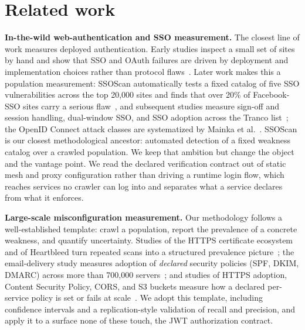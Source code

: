 \section{Related work}\label{sec:related}
\noindent\textbf{In-the-wild web-authentication and SSO measurement.} The closest
line of work measures deployed authentication. Early studies inspect a small set of
sites by hand and show that SSO and OAuth failures are driven by deployment and
implementation choices rather than protocol flaws~\cite{authzmeas2012wangsignmein,authzmeas2012sunoauth}.
Later work makes this a population measurement: SSOScan automatically tests a fixed
catalog of five SSO vulnerabilities across the top 20{,}000 sites and finds that over
20\% of Facebook-SSO sites carry a serious flaw~\cite{authzmeas2014ssoscan}, and
subsequent studies measure sign-off and session handling, dual-window SSO, and SSO
adoption across the Tranco list~\cite{authzmeas2018singlesignoff,authzmeas2022distinct,authzmeas2023ssomonitor};
the OpenID Connect attack classes are systematized by Mainka et al.~\cite{authzmeas2017soksso}.
SSOScan is our closest methodological ancestor: automated detection of a fixed
weakness catalog over a crawled population. We keep that ambition but change the
object and the vantage point. We read the declared verification contract out of
static mesh and proxy configuration rather than driving a runtime login flow, which
reaches services no crawler can log into and separates what a service declares from
what it enforces.

\noindent\textbf{Large-scale misconfiguration measurement.} Our methodology follows
a well-established template: crawl a population, report the prevalence of a concrete
weakness, and quantify uncertainty. Studies of the HTTPS certificate ecosystem and
of Heartbleed turn repeated scans into a structured prevalence
picture~\cite{authzmeas2013httpsecosystem,authzmeas2014heartbleed}; the email-delivery
study measures adoption of \emph{declared} security policies (SPF, DKIM, DMARC)
across more than 700{,}000 servers~\cite{authzmeas2015emaildelivery}; and studies of
HTTPS adoption, Content Security Policy, CORS, and S3 buckets measure how a declared
per-service policy is set or fails at scale~\cite{authzmeas2017httpsadoption,authzmeas2016csp,authzmeas2018cors,authzmeas2018s3buckets}.
We adopt this template, including confidence intervals and a replication-style
validation of recall and precision, and apply it to a surface none of these touch,
the JWT authorization contract.

